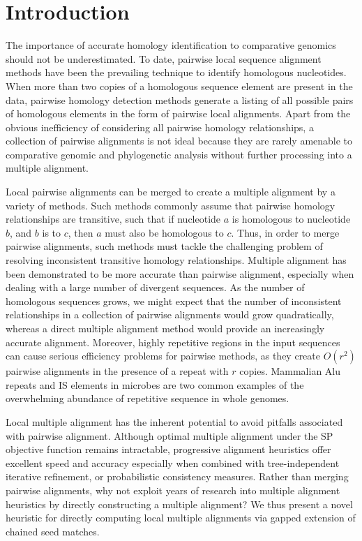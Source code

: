 \documentclass{llncs}
\begin{document}

\section{Introduction}
The importance of accurate homology identification to comparative
genomics should not be underestimated\cite{Kumar07}. To date, pairwise
local sequence alignment
methods\cite{ref-blastz,ref-ssearch,ref-pattern} have been the
prevailing technique to identify homologous nucleotides.  When more
than two copies of a homologous sequence element are present in the
data, pairwise homology detection methods generate a listing of all
possible pairs of homologous elements in the form of pairwise local
alignments.  Apart from the obvious inefficiency of considering all
pairwise homology relationships, a collection of pairwise alignments
is not ideal because they are rarely amenable to comparative genomic
and phylogenetic analysis without further processing into a multiple
alignment.

Local pairwise alignments can be merged to create a multiple alignment
by a variety of
methods\cite{ref-tba,ref-aba,ref-dialign,ref-related1}. Such methods
commonly assume that pairwise homology relationships are transitive,
such that if nucleotide $a$ is homologous to nucleotide $b$, and $b$
is to $c$, then $a$ must also be homologous to $c$.  Thus, in order to
merge pairwise alignments, such methods must tackle the challenging
problem of resolving inconsistent transitive homology relationships.
Multiple alignment has been demonstrated to be more accurate than
pairwise alignment, especially when dealing with a large number of
divergent sequences\cite{ref-mlagan,ref-aubergene}.  As the number of
homologous sequences grows, we might expect that the number of
inconsistent relationships in a collection of pairwise alignments
would grow quadratically, whereas a direct multiple alignment method
would provide an increasingly accurate alignment.  Moreover, highly
repetitive regions in the input sequences can cause serious efficiency
problems for pairwise methods, as they create $O(r^{2})$ pairwise
alignments in the presence of a repeat with $r$ copies.  Mammalian Alu
repeats and IS elements in microbes are two common examples of the
overwhelming abundance of repetitive sequence in whole genomes.

Local multiple alignment has the inherent potential to avoid pitfalls
associated with pairwise alignment. Although optimal multiple
alignment under the SP objective function remains
intractable\cite{ref-wangjiang}, progressive alignment heuristics
offer excellent speed and accuracy\cite{ref-clustalw,ref-tcoffee}
especially when combined with tree-independent iterative
refinement\cite{ref-muscle}, or probabilistic consistency
measures\cite{ref-probcons}. Rather than merging pairwise alignments,
why not exploit years of research into multiple alignment heuristics
by directly constructing a multiple alignment? We thus present a novel
heuristic for directly computing local multiple alignments via gapped
extension of chained seed matches.
\end{document}
